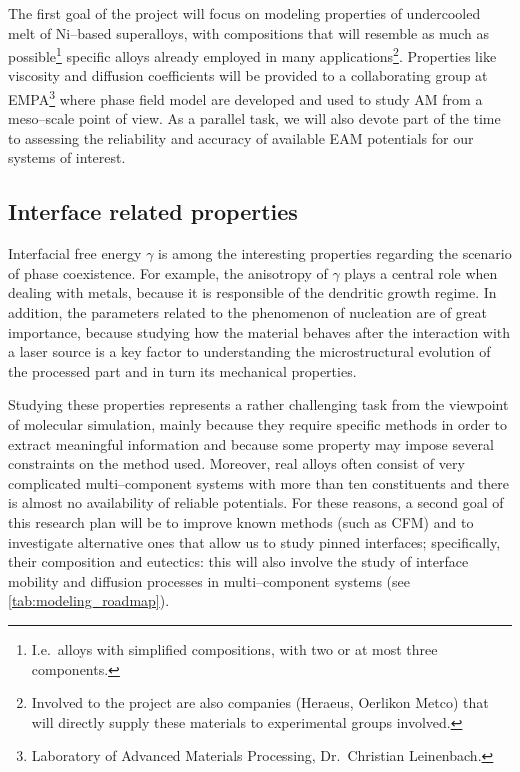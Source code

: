 The first goal of the project will focus on modeling properties of undercooled melt of Ni--based superalloys, with compositions that will resemble as much as possible\footnote{I.e.\ alloys with simplified compositions, with two or at most three components.} specific alloys already employed in many applications\footnote{Involved to the project are also companies (Heraeus, Oerlikon Metco) that will directly supply these materials to experimental groups involved.}. Properties like viscosity and diffusion coefficients will be provided to a collaborating group at EMPA\footnote{Laboratory of Advanced Materials Processing, Dr.~Christian Leinenbach.} where phase field model are developed and used to study AM from a meso--scale point of view.
As a parallel task, we will also devote part of the time to assessing the reliability and accuracy of available EAM potentials for our systems of interest.



\subsection{Interface related properties}

Interfacial free energy $\gamma$ is among the interesting properties regarding the scenario of phase coexistence. For example, the anisotropy of $\gamma$ plays a central role when dealing with metals, because it is responsible of the dendritic growth regime. In addition, the parameters related to the phenomenon of nucleation are of great importance, because studying how the material behaves after the interaction with a laser source is a key factor to understanding the microstructural evolution of the processed part and in turn its mechanical properties.

Studying these properties represents a rather challenging task from the viewpoint of molecular simulation, mainly because they require specific methods in order to extract meaningful information and because some property may impose several constraints on the method used. Moreover, real alloys often consist of very complicated multi--component systems with more than ten constituents and there is almost no availability of reliable potentials. For these reasons, a second goal of this research plan will be to improve known methods (such as CFM) and to investigate alternative ones that allow us to study pinned interfaces; specifically, their composition and eutectics: this will also involve the study of interface mobility and diffusion processes in multi--component systems (see \cref{tab:modeling_roadmap}).

